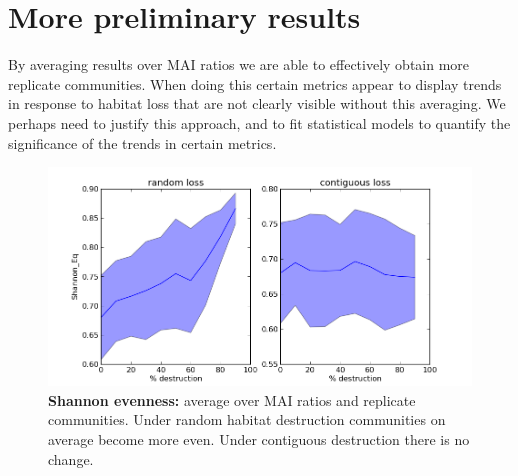 \newpage
\section{More preliminary results}
\label{sec:more_results}

By averaging results over MAI ratios we are able to effectively obtain more replicate communities. When doing this certain metrics appear to display trends in response to habitat loss that are not clearly visible without this averaging. We perhaps need to justify this approach, and to fit statistical models to quantify the significance of the trends in certain metrics. 


\begin{figure}[b!]
		\centering      
        \includegraphics[width=\textwidth]{"comparison_plots/compare_shannoneq_mean"}
        \caption{\textbf{Shannon evenness:} average over MAI ratios and replicate communities. Under random habitat destruction communities on average become more even. Under contiguous destruction there is no change.}\label{fig:shannon_eq}
\end{figure}

